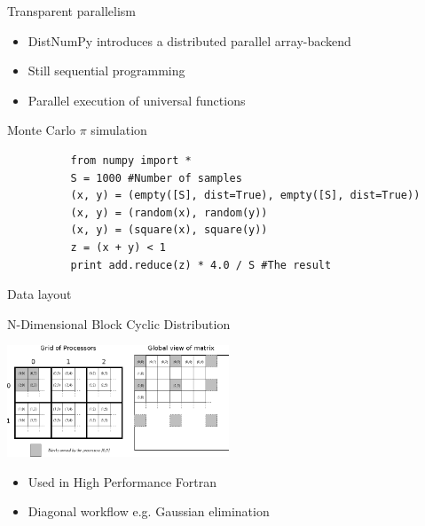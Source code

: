 \documentclass{beamer}
\begin{document}

\begin{frame}[fragile]{Transparent parallelism}
\begin{itemize}
  \item DistNumPy introduces a distributed parallel array-backend
  \item Still sequential programming
  \item Parallel execution of universal functions
\end{itemize}
\vspace{15px}
\begin{center}
\begin{small}
Monte Carlo $\pi$ simulation
\end{small}
\begin{scriptsize}
\begin{verbatim}
          from numpy import *
          S = 1000 #Number of samples
          (x, y) = (empty([S], dist=True), empty([S], dist=True))
          (x, y) = (random(x), random(y))
          (x, y) = (square(x), square(y))
          z = (x + y) < 1
          print add.reduce(z) * 4.0 / S #The result
\end{verbatim}
\end{scriptsize}
\end{center}
\end{frame}





\begin{frame}{Data layout}
\begin{center}
N-Dimensional Block Cyclic Distribution\vspace{15px}

\includegraphics[width=250px]{../gfx/datalayout}
\end{center}
\begin{itemize}
  \item Used in High Performance Fortran
  \item Diagonal workflow e.g. Gaussian elimination
\end{itemize}
\end{frame}
\end{document}
